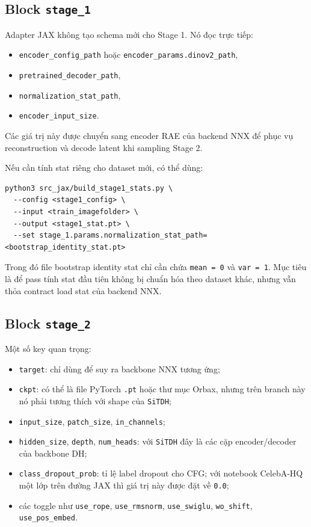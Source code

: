 \subsection{Block \texttt{stage\_1}}

Adapter JAX không tạo schema mới cho Stage 1. Nó đọc trực tiếp:

\begin{itemize}[leftmargin=1.5em]
  \item \texttt{encoder\_config\_path} hoặc \texttt{encoder\_params.dinov2\_path},
  \item \texttt{pretrained\_decoder\_path},
  \item \texttt{normalization\_stat\_path},
  \item \texttt{encoder\_input\_size}.
\end{itemize}

Các giá trị này được chuyển sang encoder RAE của backend NNX để phục vụ
reconstruction và decode latent khi sampling Stage 2.

Nếu cần tính stat riêng cho dataset mới, có thể dùng:

\begin{lstlisting}[style=rae]
python3 src_jax/build_stage1_stats.py \
  --config <stage1_config> \
  --input <train_imagefolder> \
  --output <stage1_stat.pt> \
  --set stage_1.params.normalization_stat_path=<bootstrap_identity_stat.pt>
\end{lstlisting}

Trong đó file bootstrap identity stat chỉ cần chứa \texttt{mean = 0} và
\texttt{var = 1}. Mục tiêu là để pass tính stat đầu tiên không bị chuẩn hóa theo
dataset khác, nhưng vẫn thỏa contract load stat của backend NNX.

\subsection{Block \texttt{stage\_2}}

Một số key quan trọng:

\begin{itemize}[leftmargin=1.5em]
  \item \texttt{target}: chỉ dùng để suy ra backbone NNX tương ứng;
  \item \texttt{ckpt}: có thể là file PyTorch \texttt{.pt} hoặc thư mục Orbax,
  nhưng trên branch này nó phải tương thích với shape của \texttt{SiTDH};
  \item \texttt{input\_size}, \texttt{patch\_size}, \texttt{in\_channels};
  \item \texttt{hidden\_size}, \texttt{depth}, \texttt{num\_heads}: với
  \texttt{SiTDH} đây là các cặp encoder/decoder của backbone DH;
  \item \texttt{class\_dropout\_prob}: tỉ lệ label dropout cho CFG; với
  notebook CelebA-HQ một lớp trên đường JAX thì giá trị này được đặt về
  \texttt{0.0};
  \item các toggle như \texttt{use\_rope}, \texttt{use\_rmsnorm},
  \texttt{use\_swiglu}, \texttt{wo\_shift}, \texttt{use\_pos\_embed}.
\end{itemize}

